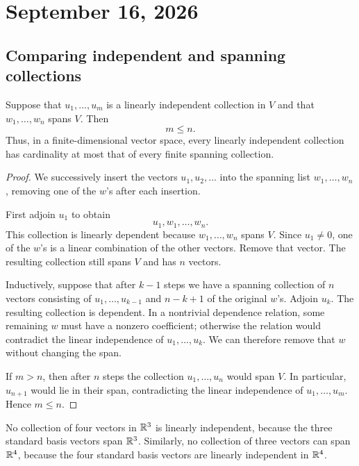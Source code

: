 \section{September 16, 2026}

\subsection{Comparing independent and spanning collections}

\begin{proposition}\label{prop:independent-versus-spanning}
  Suppose that $u_1,\ldots,u_m$ is a linearly independent collection in
  $V$ and that $w_1,\ldots,w_n$ spans $V$. Then
  \[
    m\leq n.
  \]
  Thus, in a finite-dimensional vector space, every linearly independent
  collection has cardinality at most that of every finite spanning
  collection.
\end{proposition}

\begin{proof}
  We successively insert the vectors $u_1,u_2,\ldots$ into the spanning
  list $w_1,\ldots,w_n$, removing one of the $w$'s after each insertion.

  First adjoin $u_1$ to obtain
  \[
    u_1,w_1,\ldots,w_n.
  \]
  This collection is linearly dependent because $w_1,\ldots,w_n$ spans
  $V$. Since $u_1\neq0$, one of the $w$'s is a linear combination of the
  other vectors. Remove that vector. The resulting collection still
  spans $V$ and has $n$ vectors.

  Inductively, suppose that after $k-1$ steps we have a spanning
  collection of $n$ vectors consisting of
  $u_1,\ldots,u_{k-1}$ and $n-k+1$ of the original $w$'s. Adjoin $u_k$.
  The resulting collection is dependent. In a nontrivial dependence
  relation, some remaining $w$ must have a nonzero coefficient;
  otherwise the relation would contradict the linear independence of
  $u_1,\ldots,u_k$. We can therefore remove that $w$ without changing
  the span.

  If $m>n$, then after $n$ steps the collection
  $u_1,\ldots,u_n$ would span $V$. In particular, $u_{n+1}$ would lie in
  their span, contradicting the linear independence of
  $u_1,\ldots,u_m$. Hence $m\leq n$.
\end{proof}

\begin{example}
  No collection of four vectors in $\mathbb{R}^3$ is linearly independent,
  because the three standard basis vectors span $\mathbb{R}^3$. Similarly,
  no collection of three vectors can span $\mathbb{R}^4$, because the four
  standard basis vectors are linearly independent in $\mathbb{R}^4$.
\end{example}

